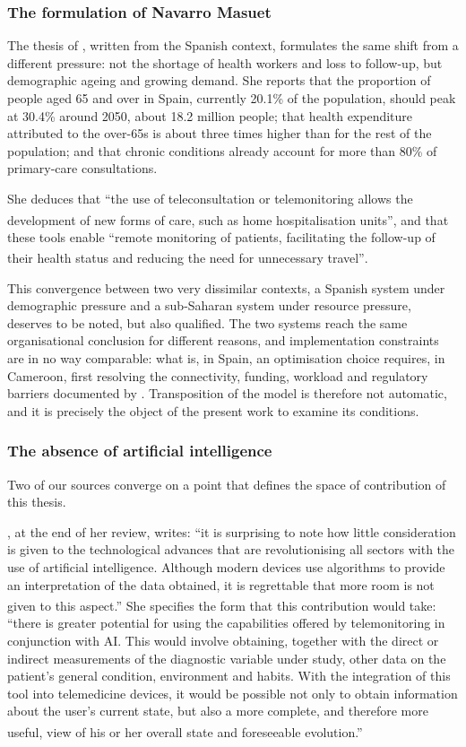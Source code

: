 \documentclass[12pt,a4paper,oneside]{report}
\newcommand{\bq}[1]{``#1''\textsuperscript{\dag}}
\begin{document}
\subsubsection{The formulation of Navarro Masuet}

The thesis of \textcite{navarro2023}, written from the Spanish context, formulates the same shift from a different pressure: not the shortage of health workers and loss to follow-up, but demographic ageing and growing demand. She reports that the proportion of people aged 65 and over in Spain, currently 20.1\% of the population, should peak at 30.4\% around 2050, about 18.2 million people; that health expenditure attributed to the over-65s is about three times higher than for the rest of the population; and that chronic conditions already account for more than 80\% of primary-care consultations.

She deduces that \bq{the use of teleconsultation or telemonitoring allows the development of new forms of care, such as home hospitalisation units}, and that these tools enable \bq{remote monitoring of patients, facilitating the follow-up of their health status and reducing the need for unnecessary travel}.

This convergence between two very dissimilar contexts, a Spanish system under demographic pressure and a sub-Saharan system under resource pressure, deserves to be noted, but also qualified. The two systems reach the same organisational conclusion for different reasons, and implementation constraints are in no way comparable: what is, in Spain, an optimisation choice requires, in Cameroon, first resolving the connectivity, funding, workload and regulatory barriers documented by \textcite{dodoo2022}. Transposition of the model is therefore not automatic, and it is precisely the object of the present work to examine its conditions.

\subsubsection{The absence of artificial intelligence}\label{sec:ai-gap}

Two of our sources converge on a point that defines the space of contribution of this thesis.

\textcite{navarro2023}, at the end of her review, writes: \bq{it is surprising to note how little consideration is given to the technological advances that are revolutionising all sectors with the use of artificial intelligence. Although modern devices use algorithms to provide an interpretation of the data obtained, it is regrettable that more room is not given to this aspect.} She specifies the form that this contribution would take: \bq{there is greater potential for using the capabilities offered by telemonitoring in conjunction with AI. This would involve obtaining, together with the direct or indirect measurements of the diagnostic variable under study, other data on the patient's general condition, environment and habits. With the integration of this tool into telemedicine devices, it would be possible not only to obtain information about the user's current state, but also a more complete, and therefore more useful, view of his or her overall state and foreseeable evolution.}
\end{document}
